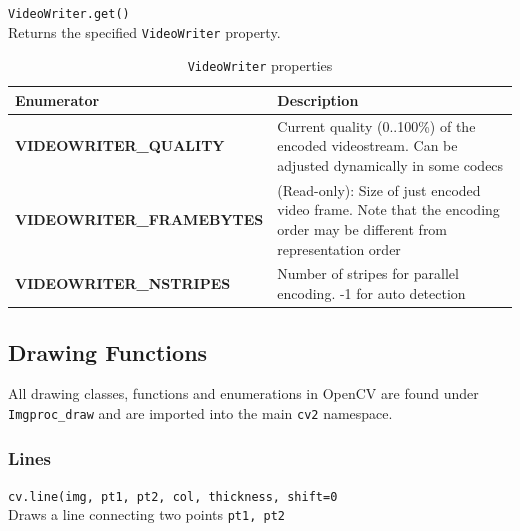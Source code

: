 \documentclass{article}
\theoremstyle{definition}
\theoremstyle{remark}
\newcommand{\func}[2]{\noindent\lstinline{#1}\\#2}
\begin{document}
\func{VideoWriter.get()}{
    Returns the specified \lstinline{VideoWriter} property.\\
}

\begin{table}[h!]
    \centering
    \def\arraystretch{1.1}%
    \begin{tabular}{ p{5cm} p{7cm} } 
    \hline
    Enumerator &  Description \\
    \hline
    \textbf{\footnotesize{VIDEOWRITER\_QUALITY}} & Current quality (0..100\%) of the encoded videostream. Can be adjusted dynamically in some codecs \\

    \textbf{\footnotesize{VIDEOWRITER\_FRAMEBYTES}} & (Read-only): Size of just encoded video frame. Note that the encoding order may be different from representation order \\

    \textbf{\footnotesize{VIDEOWRITER\_NSTRIPES}} & Number of stripes for parallel encoding. -1 for auto detection \\
    \hline
    \end{tabular}
    \caption{\lstinline{VideoWriter} properties}
    \label{table:ocv_vca_props}
\end{table}


\break


\subsection{Drawing Functions}

All drawing classes, functions and enumerations in OpenCV are found under \lstinline{Imgproc_draw} and are imported into the main \lstinline{cv2} namespace.

\subsubsection{Lines}

\func{cv.line(img, pt1, pt2, col, thickness, shift=0}{
Draws a line connecting two points \lstinline{pt1, pt2}
}
\end{document}
